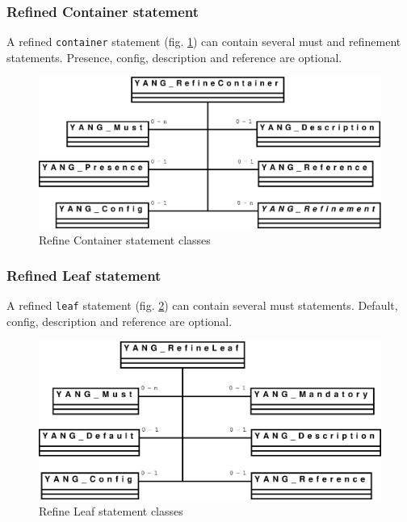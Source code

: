 \documentclass[a4paper]{article}
\begin{document}
\subsubsection{Refined Container statement}

A refined  {\tt container} statement  (fig. \ref{refinecontainer}) can
contain  several must  and refinement  statements.   Presence, config,
description and reference are optional.
\begin{figure}[htbp]
\begin{center}
\includegraphics[scale = .3]{refinecontainer.eps}
\end{center}
\caption{Refine Container statement classes}
\label{refinecontainer}
\end{figure}

\subsubsection{Refined Leaf statement}

A refined  {\tt leaf}  statement (fig.  \ref{refineleaf})  can contain
several must  statements.  Default, config,  description and reference
are optional.
\begin{figure}[htbp]
\begin{center}
\includegraphics[scale = .3]{refineleaf.eps}
\end{center}
\caption{Refine Leaf statement classes}
\label{refineleaf}
\end{figure}
\end{document}

